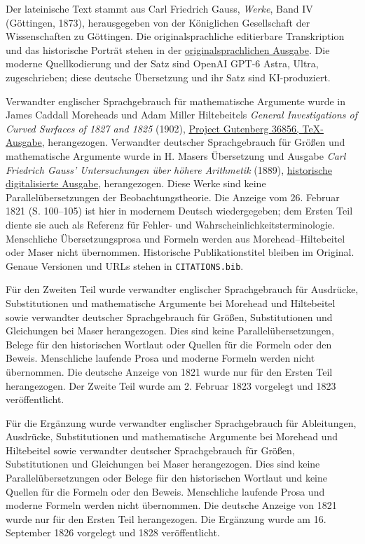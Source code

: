 \thispagestyle{empty}\begingroup\fontsize{8.5}{10}\selectfont\raggedright{}\medskip\noindent Der lateinische Text stammt aus Carl Friedrich Gauss, \textit{Werke}, Band IV (Göttingen, 1873), herausgegeben von der Königlichen Gesellschaft der Wissenschaften zu Göttingen. Die originalsprachliche editierbare Transkription und das historische Porträt stehen in der \href{https://github.com/KokunoYumeto/gauss-collected-works/releases/tag/gauss-original-language-2026-10-24}{originalsprachlichen Ausgabe}. Die moderne Quellkodierung und der Satz sind OpenAI GPT-6 Astra, Ultra, zugeschrieben; diese deutsche Übersetzung und ihr Satz sind KI-produziert.\par\medskip\noindent Verwandter englischer Sprachgebrauch für mathematische Argumente wurde in James Caddall Moreheads und Adam Miller Hiltebeitels \textit{General Investigations of Curved Surfaces of 1827 and 1825} (1902), \href{https://www.gutenberg.org/ebooks/36856}{Project Gutenberg 36856, TeX-Ausgabe}, herangezogen. Verwandter deutscher Sprachgebrauch für Größen und mathematische Argumente wurde in H. Masers Übersetzung und Ausgabe \textit{Carl Friedrich Gauss’ Untersuchungen über höhere Arithmetik} (1889), \href{https://archive.org/details/carlfriedrichga00gausgoog}{historische digitalisierte Ausgabe}, herangezogen. Diese Werke sind keine Parallelübersetzungen der Beobachtungstheorie. Die Anzeige vom 26. Februar 1821 (S. 100--105) ist hier in modernem Deutsch wiedergegeben; dem Ersten Teil diente sie auch als Referenz für Fehler- und Wahrscheinlichkeitsterminologie. Menschliche Übersetzungsprosa und Formeln werden aus Morehead--Hiltebeitel oder Maser nicht übernommen. Historische Publikationstitel bleiben im Original. Genaue Versionen und URLs stehen in \texttt{CITATIONS.bib}.\par\medskip\noindent Für den Zweiten Teil wurde verwandter englischer Sprachgebrauch für Ausdrücke, Substitutionen und mathematische Argumente bei Morehead und Hiltebeitel sowie verwandter deutscher Sprachgebrauch für Größen, Substitutionen und Gleichungen bei Maser herangezogen. Dies sind keine Parallelübersetzungen, Belege für den historischen Wortlaut oder Quellen für die Formeln oder den Beweis. Menschliche laufende Prosa und moderne Formeln werden nicht übernommen. Die deutsche Anzeige von 1821 wurde nur für den Ersten Teil herangezogen. Der Zweite Teil wurde am 2. Februar 1823 vorgelegt und 1823 veröffentlicht.\par\medskip\noindent Für die Ergänzung wurde verwandter englischer Sprachgebrauch für Ableitungen, Ausdrücke, Substitutionen und mathematische Argumente bei Morehead und Hiltebeitel sowie verwandter deutscher Sprachgebrauch für Größen, Substitutionen und Gleichungen bei Maser herangezogen. Dies sind keine Parallelübersetzungen oder Belege für den historischen Wortlaut und keine Quellen für die Formeln oder den Beweis. Menschliche laufende Prosa und moderne Formeln werden nicht übernommen. Die deutsche Anzeige von 1821 wurde nur für den Ersten Teil herangezogen. Die Ergänzung wurde am 16. September 1826 vorgelegt und 1828 veröffentlicht.\par\medskip\noindent 